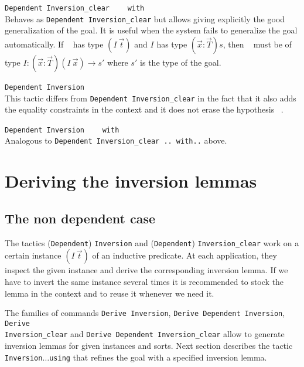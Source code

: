 \begin{Variants}

\item \texttt{Dependent Inversion\_clear } \ident~ \texttt{ with } \term\\
 \noindent Behaves as \texttt{Dependent Inversion\_clear} but allows giving
  explicitly the good generalization of the goal. It is useful when
  the system fails to generalize the goal automatically. If
  \ident~ has type $(I~\vec{t})$ and $I$ has type
  $(\vec{x}:\vec{T})s$,   then \term~  must be of type
  $I:(\vec{x}:\vec{T})(I~\vec{x})\rightarrow s'$ where $s'$ is the
  type of the goal.



\item \texttt{Dependent Inversion} \ident~\\
 This tactic differs from   \texttt{Dependent Inversion\_clear} in the fact that
  it also  adds the equality constraints in the context and
  it does not erase  the hypothesis \ident~.

\item \texttt{Dependent Inversion } \ident~ \texttt{ with } \term \\
  Analogous to \texttt{Dependent Inversion\_clear .. with..} above. 
\end{Variants}



\section[Deriving the inversion lemmas]{Deriving the inversion lemmas\label{inversion_derivation}}
\subsection{The non dependent case}

The tactics (\texttt{Dependent}) \texttt{Inversion} and (\texttt{Dependent})
{\tt Inversion\_clear} work on a
certain instance $(I~\vec{t})$ of an inductive predicate. At each
application, they inspect the given instance and derive the
corresponding inversion lemma.  If we have to invert the same
instance several times it is recommended to stock the lemma in the
context and to reuse it whenever we need it.

The families of commands \texttt{Derive Inversion}, \texttt{Derive
Dependent Inversion}, \texttt{Derive} \\ {\tt Inversion\_clear} and \texttt{Derive Dependent Inversion\_clear}
allow to generate inversion lemmas for given instances and sorts.  Next
section describes the tactic \texttt{Inversion}$\ldots$\texttt{using} that refines the
goal with a specified inversion lemma.

